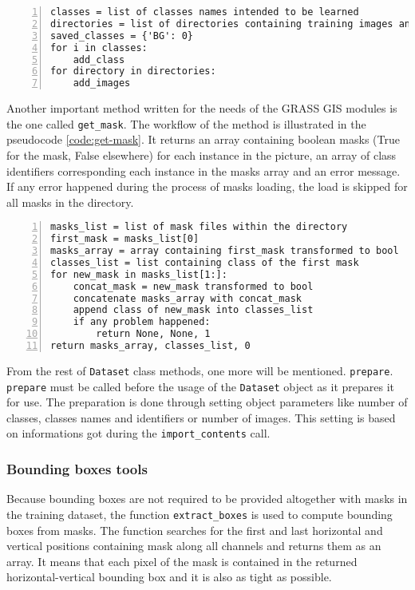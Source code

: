 {\scriptsize
\begin{lstlisting}[style=python, caption={import\_contents}, captionpos=b, label=code:feed, deletekeywords={and},
backgroundcolor = \color{light-gray}, numbers=left, breaklines=true]
classes = list of classes names intended to be learned
directories = list of directories containing training images and masks
saved_classes = {'BG': 0}
for i in classes:
	add_class
for directory in directories:
	add_images
\end{lstlisting}}

Another important method written for the needs of the GRASS GIS modules is the one called \verb|get_mask|. The workflow of the method is illustrated in the pseudocode \ref{code:get-mask}. It returns an array containing boolean masks (True for the mask, False elsewhere) for each instance in the picture, an array of class identifiers corresponding each instance in the masks array and an error message. If any error happened during the process of masks loading, the load is skipped for all masks in the directory.

{\scriptsize
\begin{lstlisting}[style=python, caption={get\_mask}, captionpos=b, label=code:get-mask, deletekeywords={class},
backgroundcolor = \color{light-gray}, numbers=left, breaklines=true]
masks_list = list of mask files within the directory
first_mask = masks_list[0]
masks_array = array containing first_mask transformed to bool
classes_list = list containing class of the first mask
for new_mask in masks_list[1:]:
	concat_mask = new_mask transformed to bool
	concatenate masks_array with concat_mask
	append class of new_mask into classes_list
	if any problem happened:
		return None, None, 1
return masks_array, classes_list, 0
\end{lstlisting}}

From the rest of \verb|Dataset| class methods, one more will be mentioned. \verb|prepare|. \verb|prepare| must be called before the usage of the \verb|Dataset| object as it prepares it for use. The preparation is done through setting object parameters like number of classes, classes names and identifiers or number of images. This setting is based on informations got during the \verb|import_contents| call.

\subsubsection{Bounding boxes tools}
\label{bbox-funcs}

Because bounding boxes are not required to be provided altogether with masks in the training dataset, the function \verb|extract_boxes| is used to compute bounding boxes from masks. The function searches for the first and last horizontal and vertical positions containing mask along all channels and returns them as an array. It means that each pixel of the mask is contained in the returned horizontal-vertical bounding box and it is also as tight as possible.

